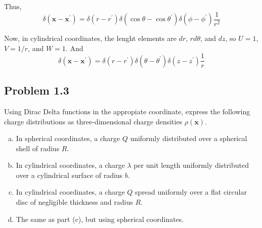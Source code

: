 Thus,
$$
\delta\left(\mathbf{x}-\mathbf{x}^\prime\right) =
\delta(r-r^\prime) \delta(\cos\theta-\cos\theta^\prime) \delta(\phi-\phi^\prime) \frac{1}{r^2}
$$

Now, in cylindrical coordinates, the lenght elements are $dr$, $rd\theta$, and $dz$, so
$U=1$, $V=1/r$, and $W=1$.
And
$$
\delta\left(\mathbf{x}-\mathbf{x}^\prime\right) =
\delta(r-r^\prime) \delta(\theta-\theta^\prime) \delta(z-z^\prime) \frac{1}{r}
$$


\subsection{Problem 1.3}

Using Dirac Delta functions in the appropiate coordinate, express the following charge distributions as three-dimensional
charge densities $\rho(\mathbf{x})$.

\begin{enumerate}[(a)]
\item In spherical coordinates, a charge $Q$ uniformly distributed over a spherical shell of radius $R$.

\item In cylindrical coordinates, a charge $\lambda$ per unit length uniformly distributed over a cylindrical
surface of radius $b$.

\item In cylindrical coordinates, a charge $Q$ spread uniformly over a flat circular disc of negligible thickness and radius $R$.

\item The same as part (c), but using spherical coordinates.
\end{enumerate}